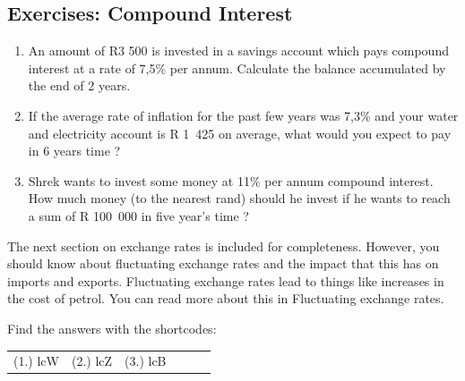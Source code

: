 \label{m39334*secfhsst!!!underscore!!!id3169}
            \subsection{Exercises: Compound Interest }
            \nopagebreak
            \label{m39334*id75300}\begin{enumerate}[noitemsep, label=\textbf{\arabic*}. ] 
            \label{m39334*uid74}\item An amount of R3 500 is invested in a savings account which pays compound interest at a rate of 7,5\% per annum. Calculate the balance accumulated by the end of 2 years.\newline
    
        
\label{m39334*uid75}\item If the average rate of inflation for the past few years was 7,3\% and your water and electricity account is R 1~425 on average, what would you expect to pay in 6 years time ?\newline
    
        
\label{m39334*uid76}\item Shrek wants to invest some money at 11\% per annum compound interest. How much money (to the nearest rand) should he invest if he wants to reach a sum of R 100~000 in five year's time ?\newline
    
        
\end{enumerate}
        
        

      
    
  \label{m39334*eip-523}The next section on exchange rates is included for completeness. However, you should know about fluctuating exchange rates and the impact that this has on imports and exports. Fluctuating exchange rates lead to things like increases in the cost of petrol. You can read more about this in Fluctuating exchange rates.\par 
  \label{m39334**end}
          
\par {} Find the answers with the shortcodes:
 \par \begin{tabular}[h]{cccccc}
 (1.) lcW  &  (2.) lcZ  &  (3.) lcB  & \end{tabular}




